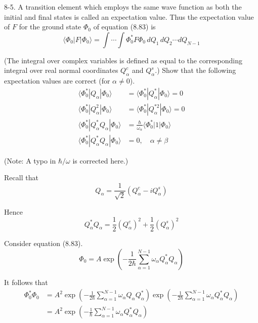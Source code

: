 \documentclass[12pt]{article}
\begin{document}
8-5.
A transition element which employs the same wave
function as both the initial and final states is called an expectation value.
Thus the expectation value of $F$ for the ground state $\Phi_0$ of
equation (8.83) is
\begin{equation*}
\langle\Phi_0|F|\Phi_0\rangle
=\int\cdots\int
\Phi_0^*F\Phi_0\,dQ_1\,dQ_2\cdots dQ_{N-1}
\tag{8.84}
\end{equation*}

(The integral over complex variables is defined as equal to the
corresponding integral over real normal coordinates $Q_\alpha^c$
and $Q_\alpha^s$.)
Show that the following expectation values are correct (for $\alpha\ne0$).
\begin{align*}
\langle\Phi_0^*|Q_\alpha|\Phi_0\rangle
&=\langle\Phi_0^*|Q_\alpha^*|\Phi_0\rangle=0
\\
\langle\Phi_0^*|Q_\alpha^2|\Phi_0\rangle
&=\langle\Phi_0^*|Q_\alpha^{*2}|\Phi_0\rangle=0
\\
\langle\Phi_0^*|Q_\alpha^*Q_\alpha|\Phi_0\rangle
&=\frac{\hbar}{\omega_\alpha}\langle\Phi_0^*|1|\Phi_0\rangle
\\
\langle\Phi_0^*|Q_\alpha^*Q_\alpha|\Phi_0\rangle&=0,\quad\alpha\ne\beta
\end{align*}

(Note: A typo in $\hbar/\omega$ is corrected here.)

\bigskip
Recall that
\begin{equation*}
Q_\alpha=\frac{1}{\sqrt2}(Q_\alpha^c-iQ_\alpha^s)
\end{equation*}

Hence
\begin{equation*}
Q_\alpha^*Q_\alpha=\frac{1}{2}(Q_\alpha^c)^2+\frac{1}{2}(Q_\alpha^s)^2
\tag{1}
\end{equation*}

Consider equation (8.83).
\begin{equation*}
\Phi_0=A\exp\left(
-\frac{1}{2\hbar}
\sum_{\alpha=1}^{N-1}
\omega_\alpha Q_\alpha^*Q_\alpha
\right)
\tag{8.83}
\end{equation*}

It follows that
\begin{align*}
\Phi_0^*\Phi_0
&=A^2
\exp\left(
-\frac{1}{2\hbar}
\sum_{\alpha=1}^{N-1}
\omega_\alpha Q_\alpha Q_\alpha^*
\right)
\exp\left(
-\frac{1}{2\hbar}
\sum_{\alpha=1}^{N-1}
\omega_\alpha Q_\alpha^*Q_\alpha
\right)
\\
&=A^2
\exp\left(
-\frac{1}{\hbar}
\sum_{\alpha=1}^{N-1}
\omega_\alpha Q_\alpha^*Q_\alpha
\right)
\tag{2}
\end{align*}
\end{document}
